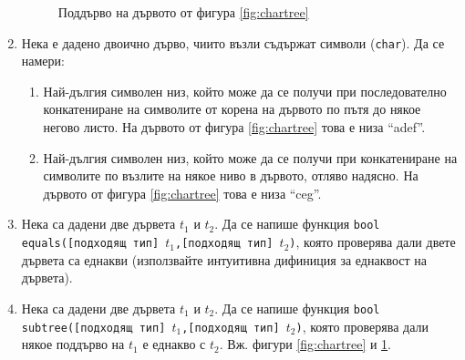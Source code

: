 \begin{enumerate}[resume]
    \begin{figure}
      \centering
      \caption{Поддърво на дървото от фигура \ref{fig:chartree}}
      \label{fig:subtree}
      \end{figure}

  \item Нека е дадено двоично дърво, чиито възли съдържат символи (\texttt{char}). Да се намери:
  
  \begin{enumerate}[label=\alph*)]
    \item Най-дългия символен низ, който може да се получи при последователно конкатениране на символите от корена на дървото по пътя до някое негово листо. На дървото от фигура \ref{fig:chartree} това е низа ``adef''.
    \item Най-дългия символен низ, който може да се получи при конкатениране на символите по възлите на някое ниво в дървото, отляво надясно. На дървото от фигура \ref{fig:chartree} това е низа ``ceg''.
  \end{enumerate}

  \item Нека са дадени две дървета $t_1$ и $t_2$. Да се напише функция \texttt{bool equals([подходящ тип] $t_1$,[подходящ тип] $t_2$)}, която проверява дали двете дървета са еднакви (използвайте интуитивна дифиниция за еднаквост на дървета).

  \item Нека са дадени две дървета $t_1$ и $t_2$. Да се напише функция \texttt{bool subtree([подходящ тип] $t_1$,[подходящ тип] $t_2$)}, която проверява дали някое поддърво на $t_1$ е еднакво с $t_2$. Вж. фигури \ref{fig:chartree} и \ref{fig:subtree}.

\end{enumerate}


